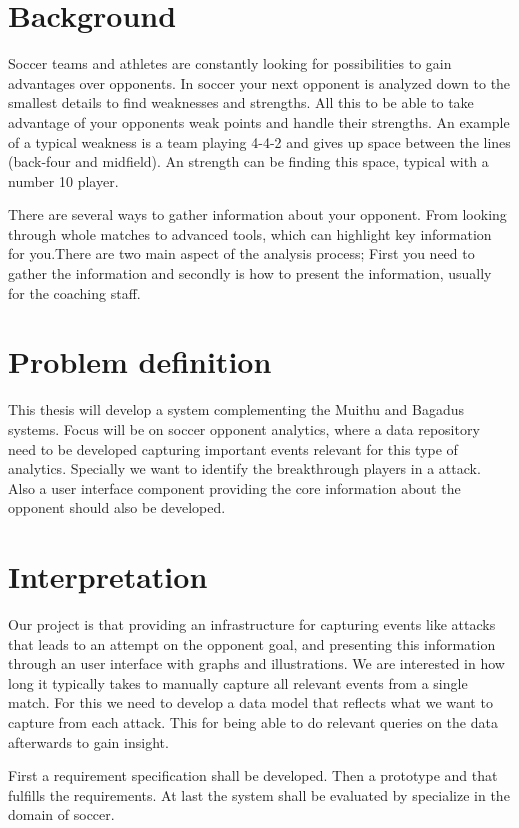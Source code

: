 \section{Background}

Soccer teams and athletes are constantly looking for possibilities to gain advantages over opponents. In soccer your next opponent is analyzed down to the smallest details to find weaknesses and strengths. All this to be able to take advantage of your opponents weak points and handle their strengths. An example of a typical weakness is a team playing 4-4-2 and gives up space between the lines (back-four and midfield). An strength can be finding this space, typical with a number 10 player.

There are several ways to gather information about your opponent. From looking through whole matches to advanced tools, which can highlight key information for you.There are two main aspect of the analysis process; First you need to gather the information and secondly is how to present the information, usually for the coaching staff.

\section{Problem definition}

This thesis will develop a system complementing the Muithu and Bagadus systems. Focus will be on soccer opponent analytics, where a data repository need to be developed capturing important events relevant for this type of analytics. Specially we want to identify the breakthrough players in a attack. Also a user interface component providing the core information about the opponent should also be developed. 

\section{Interpretation}

Our project is that providing an infrastructure for capturing events like attacks that leads to an attempt on the opponent goal, and presenting this information through an user interface with graphs and illustrations. We are interested in how long it typically takes to manually capture all relevant events from a single match. For this we need to develop a data model that reflects what we want to capture from each attack. This for being able to do relevant queries on the data afterwards to gain insight.

First a requirement specification shall be developed. Then a prototype and that fulfills the requirements. At last the system shall be evaluated by  specialize in the domain of soccer.

